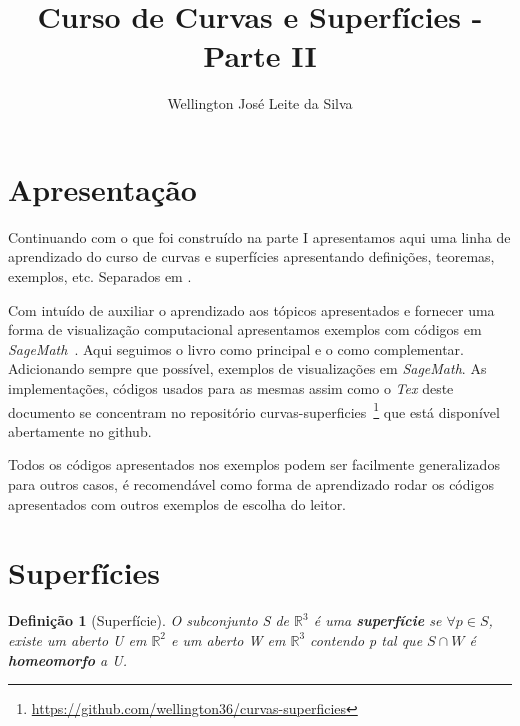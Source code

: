 \documentclass[12pt]{article}
\title{Curso de Curvas e Superfícies - Parte II}
\author{Wellington José Leite da Silva\inst{1}}
\date{}
\newtheorem{definition}{Definição}
\newcommand{\furl}[1]{\footnote{\url{#1}}}
\begin{document}
\maketitle

\section*{Apresentação}\label{s1}
Continuando com o que foi construído na parte I apresentamos aqui uma linha de aprendizado do curso de curvas e superfícies apresentando definições, teoremas, exemplos, etc. Separados em . 

Com intuído de auxiliar o aprendizado aos tópicos apresentados e fornecer uma forma de visualização computacional apresentamos exemplos com códigos em \textit{SageMath}~\cite{sagemath}. Aqui seguimos o livro \cite{bookmain} como principal e o \cite{manfredo} como complementar. Adicionando sempre que possível, exemplos de visualizações em \textit{SageMath}. As implementações, códigos usados para as mesmas assim como o \textit{Tex} deste documento se concentram no repositório curvas-superficies~\furl{https://github.com/wellington36/curvas-superficies} que está disponível abertamente no github.

Todos os códigos apresentados nos exemplos podem ser facilmente generalizados para outros casos, é recomendável como forma de aprendizado rodar os códigos apresentados com outros exemplos de escolha do leitor.

\section{Superfícies}\label{s2}
\begin{definition}[Superfície]
O subconjunto S de $\mathbb{R}^3$ é uma \textbf{superfície} se $\forall p \in S$, existe um aberto U em $\mathbb{R}^2$ e um aberto W em $\mathbb{R}^3$ contendo p tal que $S \cap W$ é \textbf{homeomorfo} a U.
\end{definition}
\end{document}
